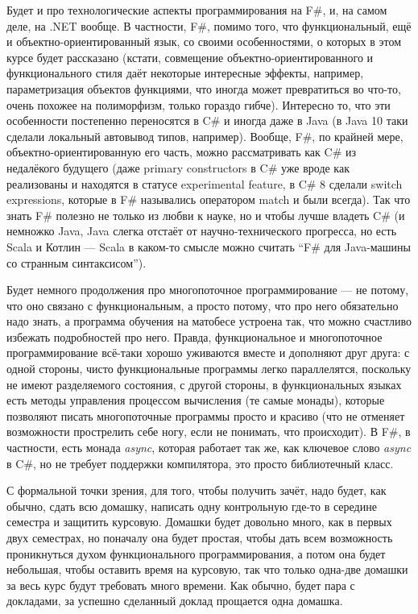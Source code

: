 \documentclass[a5paper]{article}
\begin{document}
Будет и про технологические аспекты программирования на F\#, и, на самом деле, на .NET вообще. В частности, F\#, помимо того, что функциональный, ещё и объектно-ориентированный язык, со своими особенностями, о которых в этом курсе будет рассказано (кстати, совмещение объектно-ориентированного и функционального стиля даёт некоторые интересные эффекты, например, параметризация объектов функциями, что иногда может превратиться во что-то, очень похожее на полиморфизм, только гораздо гибче). Интересно то, что эти особенности постепенно переносятся в C\# и иногда даже в Java (в Java 10 таки сделали локальный автовывод типов, например). Вообще, F\#, по крайней мере, объектно-ориентированную его часть, можно рассматривать как C\# из недалёкого будущего (даже primary constructors в C\# уже вроде как реализованы и находятся в статусе experimental feature, в C\# 8 сделали switch expressions, которые в F\# назывались оператором match и были всегда). Так что знать F\# полезно не только из любви к науке, но и чтобы лучше владеть C\# (и немножко Java, Java слегка отстаёт от научно-технического прогресса, но есть Scala и Котлин --- Scala в каком-то смысле можно считать ``F\# для Java-машины со странным синтаксисом'').

Будет немного продолжения про многопоточное программирование --- не потому, что оно связано с функциональным, а просто потому, что про него обязательно надо знать, а программа обучения на матобесе устроена так, что можно счастливо избежать подробностей про него. Правда, функциональное и многопоточное программирование всё-таки хорошо уживаются вместе и дополняют друг друга: с одной стороны, чисто функциональные программы легко параллелятся, поскольку не имеют разделяемого состояния, с другой стороны, в функциональных языках есть методы управления процессом вычисления (те самые монады), которые позволяют писать многопоточные программы просто и красиво (что не отменяет возможности прострелить себе ногу, если не понимать, что происходит). В F\#, в частности, есть монада \textit{async}, которая работает так же, как ключевое слово \textit{async} в C\#, но не требует поддержки компилятора, это просто библиотечный класс.

С формальной точки зрения, для того, чтобы получить зачёт, надо будет, как обычно, сдать всю домашку, написать одну контрольную где-то в середине семестра и защитить курсовую. Домашки будет довольно много, как в первых двух семестрах, но поначалу она будет простая, чтобы дать всем возможность проникнуться духом функционального программирования, а потом она будет небольшая, чтобы оставить время на курсовую, так что только одна-две домашки за весь курс будут требовать много времени. Как обычно, будет пара с докладами, за успешно сделанный доклад прощается одна домашка.
\end{document}
